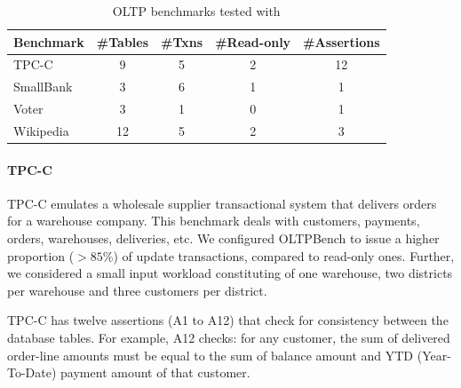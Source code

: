 
\begin{table}
  \centering
  \footnotesize
	\begin{tabular}{|l|c|c|c|c|}
    \hline
		Benchmark & \#Tables & \#Txns &\#Read-only & \#Assertions \\ \hline
		TPC-C &  9 & 5 & 2& 12\\
		SmallBank & 3 & 6 & 1 & 1\\
		Voter & 3 & 1 & 0 & 1\\
		Wikipedia & 12 & 5 & 2 & 3\\
		\hline
	\end{tabular}	
	\caption{OLTP benchmarks tested with \tool{}}
	\label{table-bench}
\end{table}


\paragraph{TPC-C} TPC-C emulates a wholesale supplier transactional system
that delivers orders for a warehouse company.
This benchmark deals with customers, payments, orders, warehouses, 
deliveries, etc. 
We configured OLTPBench to issue a higher proportion ($>85\%$) of update
transactions, compared to read-only ones.  
Further, we considered a small input workload constituting of one warehouse, two
districts per warehouse and three customers per district.


TPC-C has twelve assertions (A1 to A12) that check for consistency between 
the database tables.
For example, A12 checks: for any customer, the sum of delivered order-line
amounts must be equal to the sum of balance amount and YTD (Year-To-Date)
payment amount of that customer.

